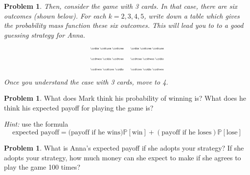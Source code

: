 \documentclass[10pt]{article}
\theoremstyle{definition}
\newtheorem{problem}[theorem]{Problem}
\newcommand{\1}[1]{\textbf{1}_{\left[#1\right]}} %
\def\P{\mathbb{P}} %
\begin{document}
\begin{problem}
  \textit{Then, consider the game with 3 cards. In that case, there are six
    outcomes (shown below). For each $k=2,3,4,5$, write down a table which
    gives the probability mass function these six outcomes. This will lead you
    to to a good guessing strategy for Anna.}
  \begin{align*}
    &\scalebox{0.4}{\crdAs \crdtwos \crdtres}  &\scalebox{0.4}{\crdAs \crdtres \crdtwos} \\
    &\scalebox{0.4}{\crdtwos \crdAs \crdtres}  &\scalebox{0.4}{\crdtres \crdtwos \crdAs} \\
    &\scalebox{0.4}{\crdtwos \crdtres \crdAs}  &\scalebox{0.4}{\crdtres \crdAs \crdtwos} 
  \end{align*}
  \textit{Once you understand the case with 3 cards, move to
    4.}
\end{problem}

\begin{problem}
  What does Mark think his probability of winning is? What does he think his
  expected payoff for playing the game is?

  \textit{Hint:} use the formula
  \begin{equation*}
    \text{expected payoff} = \text{(payoff if he wins)}\P\left[\text{win} \right] +
    (\text{payoff if he loses}) \P\left[\text{lose} \right]
  \end{equation*}
  
\end{problem}

\begin{problem}
  What is Anna's expected payoff if she adopts your strategy? If she adopts
  your strategy, how much money can she expect to make if she agrees to play
  the game 100 times?
\end{problem}
\end{document}
